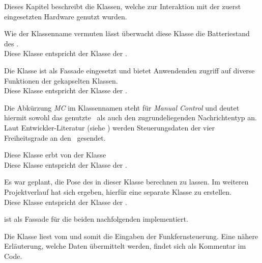 
Dieses Kapitel beschreibt die Klassen, welche zur Interaktion mit der zuerst eingesetzten Hardware genutzt wurden.







Wie der Klassenname vermuten lässt überwacht diese Klasse die Batteriestand des \Quad[s].
\\Diese Klasse entspricht der Klasse  der \Ar.


Die Klasse  ist als Fassade eingesetzt und bietet Anwendenden zugriff auf diverse Funktionen der gekapselten Klassen.
\\Diese Klasse entspricht der Klasse  der \Ar.


Die Abkürzung \textit{MC} im Klassennamen steht für \textit{Manual Control} und deutet hiermit sowohl das genutzte \Topic\ als auch den zugrundeliegenden Nachrichtentyp an. Laut Entwickler-Literatur (siehe ) werden Steuerungsdaten der vier Freiheitsgrade an den \Quad\ gesendet. 

Diese Klasse erbt von der Klasse 
\\Diese Klasse entspricht der Klasse  der \Ar.


Es war geplant, die Pose des \Quad[s] in dieser Klasse berechnen zu lassen. Im weiteren Projektverlauf hat sich ergeben, hierfür eine separate Klasse zu erstellen.
\\Diese Klasse entspricht der Klasse  der \Ar.


 ist als Fassade für die beiden nachfolgenden implementiert.


Die Klasse  liest vom  und somit die Eingaben der Funkfernsteuerung. Eine nähere Erläuterung, welche Daten übermittelt werden, findet sich als Kommentar im Code.


